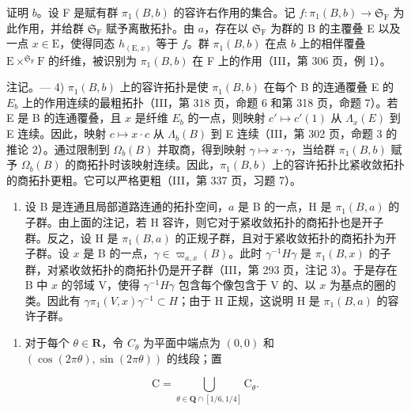 证明 \(b\)。设 F 是赋有群 \(\pi_1(B,b)\) 的容许右作用的集合。记 \(f: \pi_1(B,b) \to \mathfrak{S}_{\mathrm{F}}\) 为此作用，并给群 \(\mathfrak{S}_{\mathrm{F}}\) 赋予离散拓扑。由 \(a\)，存在以 \(\mathfrak{S}_{\mathrm{F}}\) 为群的 B 的主覆叠 E 以及一点 \(x \in \mathrm{E}\)，使得同态 \(h_{(\mathrm{E},x)}\) 等于 \(f\)。群 \(\pi_1(B,b)\) 在点 \(b\) 上的相伴覆叠 \(\mathrm{E} \times^{\mathfrak{S}_{\mathrm{F}}} \mathrm{F}\) 的纤维，被识别为 \(\pi_1(B,b)\) 在 F 上的作用（III，第 306 页，例 1）。

注记。--- 4) \(\pi_1(B, b)\) 上的容许拓扑是使 \(\pi_1(B, b)\) 在每个 B 的连通覆叠 E 的 \(E_b\) 上的作用连续的最粗拓扑（III，第 318 页，命题 6 和第 318 页，命题 7）。若 E 是 B 的连通覆叠，且 \(x\) 是纤维 \(E_b\) 的一点，则映射 \(c' \mapsto c'(1)\) 从 \(\Lambda_x(E)\) 到 E 连续。因此，映射 \(c \mapsto x \cdot c\) 从 \(\Lambda_b(B)\) 到 E 连续（III，第 302 页，命题 3 的推论 2）。通过限制到 \(\Omega_b(B)\) 并取商，得到映射 \(\gamma \mapsto x \cdot \gamma\)，当给群 \(\pi_1(B, b)\) 赋予 \(\Omega_b(B)\) 的商拓扑时该映射连续。因此，\(\pi_{1}(B,b)\) 上的容许拓扑比紧收敛拓扑的商拓扑更粗。它可以严格更粗（III，第 337 页，习题 7）。

\begin{enumerate}
\def\labelenumi{\arabic{enumi})}
\setcounter{enumi}{4}
\tightlist
\item
设 B 是连通且局部道路连通的拓扑空间，\(a\) 是 B 的一点，H 是 \(\pi_1(B,a)\) 的子群。由上面的注记，若 H 容许，则它对于紧收敛拓扑的商拓扑也是开子群。反之，设 H 是 \(\pi_1(B,a)\) 的正规子群，且对于紧收敛拓扑的商拓扑为开子群。设 \(x\) 是 B 的一点，\(\gamma \in \varpi_{a,x}(B)\)。此时 \(\gamma^{-1}H\gamma\) 是 \(\pi_1(B,x)\) 的子群，对紧收敛拓扑的商拓扑仍是开子群（III，第 293 页，注记 3）。于是存在 B 中 \(x\) 的邻域 V，使得 \(\gamma^{-1}H\gamma\) 包含每个像包含于 V 的、以 \(x\) 为基点的圈的类。因此有 \(\gamma \pi_1(V,x)\gamma^{-1} \subset H\)；由于 H 正规，这说明 H 是 \(\pi_1(B,a)\) 的容许子群。
\end{enumerate}


\exercisegroup

\begin{enumerate}
\def\labelenumi{\arabic{enumi})}
\tightlist
\item
  对于每个 \(\theta \in \mathbf{R}\)，令 \(C_{\theta}\) 为平面中端点为 \((0,0)\) 和 \((\cos(2\pi\theta), \sin(2\pi\theta))\) 的线段；置
\end{enumerate}

\[
\mathrm{C} = \bigcup_ {\theta \in \mathbf {Q} \cap [ 1 / 6, 1 / 4 ]} \mathrm{C} _ {\theta}.
\]

